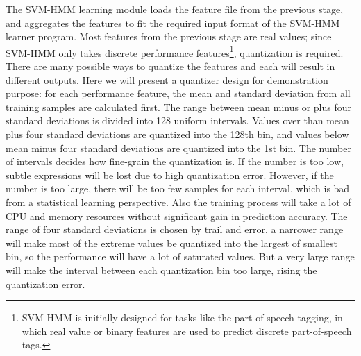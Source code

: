 The SVM-HMM learning module loads the feature file from the previous stage, and aggregates the features to fit the required input format of the SVM-HMM learner program. Most features from the previous stage are real values; since SVM-HMM only takes discrete performance features\footnote{SVM-HMM is initially designed for tasks like the part-of-speech tagging, in which real value or binary features are used to predict discrete part-of-speech tags.}, quantization is required. There are many possible ways to quantize the features and each will result in different outputs. Here we will present a quantizer design for demonstration purpose: for each performance feature, the mean and standard deviation from all training samples are calculated first. The range between mean minus or plus four standard deviations is divided into 128 uniform intervals. Values over than mean plus four standard deviations are quantized into the 128th bin, and values below mean minus four standard deviations are quantized into the 1st bin. The number of intervals decides how fine-grain the quantization is. If the number is too low, subtle expressions will be lost due to high quantization error. However, if the number is too large, there will be too few samples for each interval, which is bad from a statistical learning perspective. Also the training process will take a lot of CPU and memory resources without significant gain in prediction accuracy. The range of four standard deviations is chosen by trail and error, a narrower range will make most of the extreme values be quantized into the largest of smallest bin, so the performance will have a lot of saturated values. But a very large range will make the interval between each quantization bin too large, rising the quantization error. %

